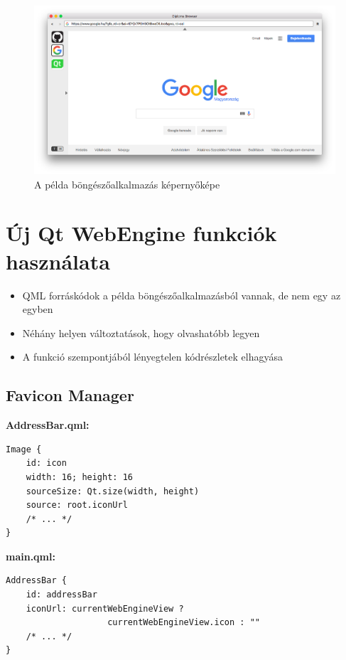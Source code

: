 \documentclass[12pt]{report}
\begin{document}
\begin{figure}[H]
    \centering
    \includegraphics[scale=0.34]{diplomabrowser}
    \caption{
        \label{fig:diplomabrowser}
        A példa böngészőalkalmazás képernyőképe
    }
\end{figure}

\newpage
\section{Új Qt WebEngine funkciók használata}

\begin{itemize}
    \item QML forráskódok a példa böngészőalkalmazásból vannak, de nem egy az egyben
    \item Néhány helyen változtatások, hogy olvashatóbb legyen
    \item A funkció szempontjából lényegtelen kódrészletek elhagyása
\end{itemize}

\subsection{Favicon Manager}

\noindent
\textbf{AddressBar.qml:}
\begin{verbatim}
Image {
    id: icon
    width: 16; height: 16
    sourceSize: Qt.size(width, height)
    source: root.iconUrl
    /* ... */
}
\end{verbatim}

\noindent
\textbf{main.qml:}
\begin{verbatim}
AddressBar {
    id: addressBar
    iconUrl: currentWebEngineView ?
                    currentWebEngineView.icon : ""
    /* ... */
}
\end{verbatim}
\end{document}
